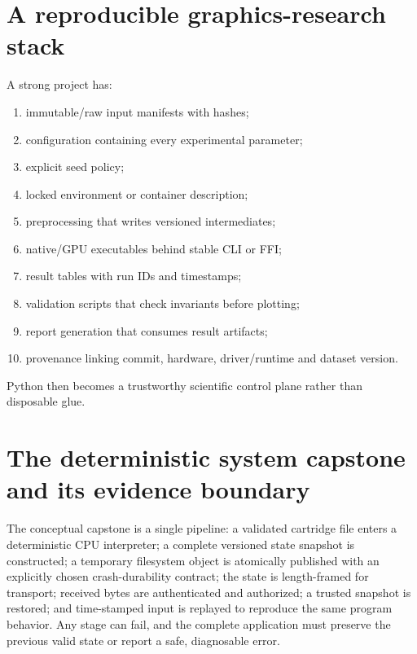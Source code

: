 \section{A reproducible graphics-research stack}\label{01-foundations-i-ch017-a-reproducible-graphics-research-stack}

A strong project has:

\begin{enumerate}
\def\labelenumi{\arabic{enumi}.}
\tightlist
\item
  immutable/raw input manifests with hashes;
\item
  configuration containing every experimental parameter;
\item
  explicit seed policy;
\item
  locked environment or container description;
\item
  preprocessing that writes versioned intermediates;
\item
  native/GPU executables behind stable CLI or FFI;
\item
  result tables with run IDs and timestamps;
\item
  validation scripts that check invariants before plotting;
\item
  report generation that consumes result artifacts;
\item
  provenance linking commit, hardware, driver/runtime and dataset version.
\end{enumerate}

Python then becomes a trustworthy scientific control plane rather than disposable glue.

\section{The deterministic system capstone and its evidence boundary}\label{01-foundations-i-ch017-the-deterministic-system-capstone-and-its-evidence-boundary}

The conceptual capstone is a single pipeline: a validated cartridge file enters a deterministic CPU interpreter; a complete versioned state snapshot is constructed; a temporary filesystem object is atomically published with an explicitly chosen crash-durability contract; the state is length-framed for transport; received bytes are authenticated and authorized; a trusted snapshot is restored; and time-stamped input is replayed to reproduce the same program behavior. Any stage can fail, and the complete application must preserve the previous valid state or report a safe, diagnosable error.

